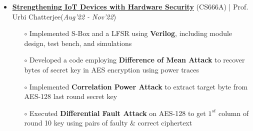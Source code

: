 \documentclass[10.8pt, a4paper]{extarticle}
\begin{document}
\begin{itemize}
  \item \href{https://github.com/vamshimorlawar/CS666A} {\textbf{Strengthening IoT Devices with Hardware Security}} (CS666A) | Prof. Urbi Chatterjee\hfill\hfill(\textit{Aug'22 - Nov'22})
	\begin{itemize}
	    \item[$\circ$] Implemented S-Box and a LFSR using \textbf{Verilog}, including module design, test bench, and simulations \\[-0.6cm]
	    \item[$\circ$] Developed a code employing \textbf{Difference of Mean Attack} to recover bytes of secret key in AES encryption using power traces\\[-0.6cm]
	    \item[$\circ$] Implemented \textbf{Correlation Power Attack} to extract target byte from AES-128 last round secret key \\[-0.6cm]
	    \item[$\circ$] Executed \textbf{Differential Fault Attack} on AES-128 to get $1^{st}$ column of round 10 key using pairs of faulty $\&$ correct ciphertext  \\[-0.6cm]
	\end{itemize}
  \vspace{0.055cm}
\end{itemize}
\end{document}
